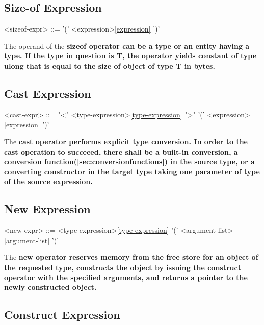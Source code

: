 \documentclass[a4paper,oneside,11pt]{article}
\begin{document}
\subsection{Size-of Expression}

\begin{grammar}
\label{sizeof-expr}<sizeof-expr> ::=  '(' <expression>\ref{expression} ')'
\end{grammar}

The operand of the \bf{sizeof} operator can be a type or an entity having a type.
If the type in question is T, the operator yields constant of type \bf{ulong} that is equal to the size of object of type T in bytes.

\subsection{Cast Expression}\label{sec:castexpression}

\begin{grammar}
\label{cast-expr}<cast-expr> ::=  "<" <type-expression>\ref{type-expression} ">" '(' <expression>\ref{expression} ')'
\end{grammar}

The \bf{cast} operator performs explicit type conversion.
In order to the cast operation to succeeed, there shall be a built-in conversion, a conversion function(\ref{sec:conversionfunctions}) in the source type,
or a converting constructor in the target type taking one parameter of type of the source expression.

\subsection{New Expression}

\begin{grammar}
\label{new-expr}<new-expr> ::=  <type-expression>\ref{type-expression} '(' <argument-list>\ref{argument-list} ')'
\end{grammar}

The \bf{new} operator reserves memory from the free store for an object of the requested type,
constructs the object by issuing the \bf{construct} operator with the specified arguments,
and returns a pointer to the newly constructed object.

\subsection{Construct Expression}
\end{document}
